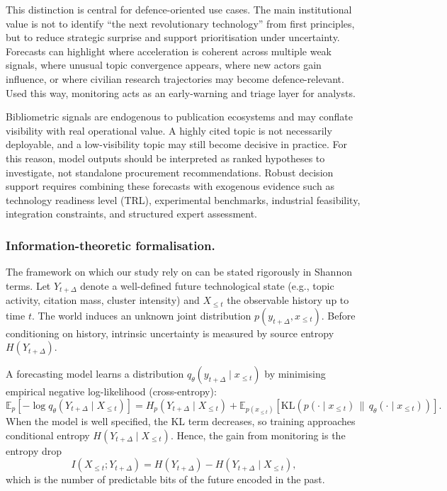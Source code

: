 \documentclass{article}
\begin{document}
This distinction is central for defence-oriented use cases.
The main institutional value is not to identify ``the next revolutionary technology'' from first principles, but to reduce strategic surprise and support prioritisation under uncertainty.
Forecasts can highlight where acceleration is coherent across multiple weak signals, where unusual topic convergence appears, where new actors gain influence, or where civilian research trajectories may become defence-relevant.
Used this way, monitoring acts as an early-warning and triage layer for analysts.

Bibliometric signals are endogenous to publication ecosystems and may conflate visibility with real operational value.
A highly cited topic is not necessarily deployable, and a low-visibility topic may still become decisive in practice.
For this reason, model outputs should be interpreted as ranked hypotheses to investigate, not standalone procurement recommendations.
Robust decision support requires combining these forecasts with exogenous evidence such as technology readiness level (TRL), experimental benchmarks, industrial feasibility, integration constraints, and structured expert assessment.

\subsubsection{Information-theoretic formalisation.}
The framework on which our study rely on can be stated rigorously in Shannon terms.
Let $Y_{t+\Delta}$ denote a well-defined future technological state (e.g., topic activity, citation mass, cluster intensity) and $X_{\leq t}$ the observable history up to time $t$.
The world induces an unknown joint distribution $p(y_{t+\Delta}, x_{\leq t})$.
Before conditioning on history, intrinsic uncertainty is measured by source entropy $H(Y_{t+\Delta})$.

A forecasting model learns a distribution $q_{\theta}(y_{t+\Delta}\mid x_{\leq t})$ by minimising empirical negative log-likelihood (cross-entropy):
\[
\mathbb{E}_{p}\!\left[-\log q_{\theta}(Y_{t+\Delta}\mid X_{\leq t})\right]
= H_{p}(Y_{t+\Delta}\mid X_{\leq t})
+ \mathbb{E}_{p(x_{\leq t})}\!\left[
\mathrm{KL}\!\left(p(\cdot\mid x_{\leq t}) \,\|\, q_{\theta}(\cdot\mid x_{\leq t})\right)\right].
\]
When the model is well specified, the KL term decreases, so training approaches conditional entropy $H(Y_{t+\Delta}\mid X_{\leq t})$. Hence, the gain from monitoring is the entropy drop
\[
I(X_{\leq t};Y_{t+\Delta})
= H(Y_{t+\Delta}) - H(Y_{t+\Delta}\mid X_{\leq t}),
\]
which is the number of predictable bits of the future encoded in the past.
\end{document}
